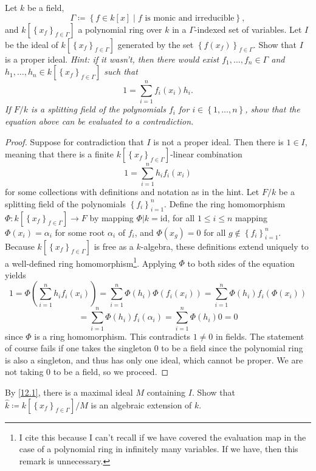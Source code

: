 \documentclass[11pt, letterpaper]{article}
\begin{document}
\begin{problem}\label{12.1}
Let $k$ be a field,
\[
	\Gamma \coloneqq \left\{ f\in k[x]\mid f\text{ is monic and irreducible}  \right\} ,
\]
and $k[\left\{ x_f \right\}_{f\in \Gamma } ]$ a polynomial ring over $k$ in a $\Gamma $-indexed set of variables. Let $I$ be the ideal of $k[\left\{ x_f \right\} _{f\in \Gamma } ]$ generated by the set $\left\{ f(x_f) \right\} _{f\in \Gamma } $. Show that $I$ is a proper ideal. \emph{Hint: if it wasn't, then there would exist $f_1, \ldots ,f_n\in \Gamma $ and $h_1, \ldots ,h_n\in k[\left\{ x_f \right\}_{f\in \Gamma } ]$ such that}
\[
	1=\sum_{i=1} ^n f_i(x_i)h_i
.\]
\emph{If $F/k$ is a  splitting field of the polynomials $f_i$ for $i\in \left\{ 1, \ldots ,n \right\} $, show that the equation above can be evaluated to a contradiction.}
\end{problem}
\begin{proof}
	Suppose for contradiction that $I$ is not a proper ideal. Then there is $1\in I$, meaning that there is a finite $k[\left\{ x_f \right\}_{f\in \Gamma } ]$-linear combination
	\[
		1=\sum_{i=1} ^n h_i f_i(x_i)
	\]
	for some collections with definitions and notation as in the hint. Let $F/k$ be a splitting field of the polynomials $\left\{ f_i \right\}_{i=1} ^n$. Define the ring homomorphism $\Phi  : k[\left\{ x_f \right\} _{f\in \Gamma } ]\to F$ by mapping $\Phi |k=\mathrm{id} $, for all $1 \leq i \leq n$ mapping $\Phi (x_{i} )=\alpha _i$ for some root $\alpha _i$ of $f_i$, and $\Phi (x_g)=0$ for all $g \notin \left\{ f_i \right\} _{i=1} ^n$. Because $k[\left\{ x_f \right\} _{f\in \Gamma } ]$ is free as a $k$-algebra, these definitions extend uniquely to a well-defined ring homomorphism\footnote{I cite this because I can't recall if we have covered the evaluation map in the case of a polynomial ring in infinitely many variables. If we have, then this remark is unnecessary.}. Applying $\Phi $ to both sides of the equation yields
	\[
		1=\Phi \left( \sum_{i=1} ^n h_i f_i(x_i) \right) = \sum_{i=1}^{n} \Phi (h_i)\Phi (f_i(x_i))=\sum_{i=1}^{n} \Phi (h_i)f_i(\Phi (x_i))
	\]
	\[
		=\sum_{i=1}^{n} \Phi (h_i)f_i(\alpha _i)=\sum_{i=1}^{n} \Phi (h_i)0=0
	\]
	since $\Phi $ is a ring homomorphism. This contradicts $1\neq 0$ in fields. The statement of course fails if one takes the singleton 0 to be a field since the polynomial ring is also a singleton, and thus has only one ideal, which cannot be proper. We are not taking 0 to be a field, so we proceed.
\end{proof}
\begin{problem}\label{12.2}
	By \cref{12.1}, there is a maximal ideal $M$ containing $I$. Show that $\hat{k} \coloneqq k[\left\{ x_f \right\} _{f\in \Gamma } ] / M$ is an algebraic extension of $k$.
\end{problem}
\end{document}
